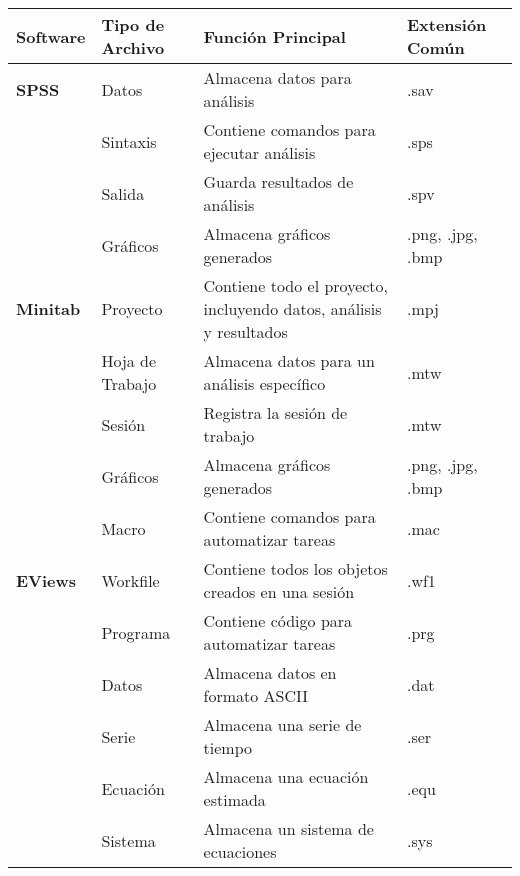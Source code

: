 \documentclass[
  stu,
  floatsintext,
  longtable,
  a4paper,
  nolmodern,
  notxfonts,
  notimes,
  colorlinks=true,linkcolor=blue,citecolor=blue,urlcolor=blue]{apa7}
\begin{document}
\begin{longtable}[]{@{}
  >{\raggedright\arraybackslash}p{}
  >{\raggedright\arraybackslash}p{}
  >{\raggedright\arraybackslash}p{}
  >{\raggedright\arraybackslash}p{}@{}}
\toprule\noalign{}
\begin{minipage}[b]{\linewidth}\raggedright
Software
\end{minipage} & \begin{minipage}[b]{\linewidth}\raggedright
Tipo de Archivo
\end{minipage} & \begin{minipage}[b]{\linewidth}\raggedright
Función Principal
\end{minipage} & \begin{minipage}[b]{\linewidth}\raggedright
Extensión Común
\end{minipage} \\
\midrule\noalign{}
\endhead
\bottomrule\noalign{}
\endlastfoot
\textbf{SPSS} & Datos & Almacena datos para análisis & .sav \\
& Sintaxis & Contiene comandos para ejecutar análisis & .sps \\
& Salida & Guarda resultados de análisis & .spv \\
& Gráficos & Almacena gráficos generados & .png, .jpg, .bmp \\
\textbf{Minitab} & Proyecto & Contiene todo el proyecto, incluyendo
datos, análisis y resultados & .mpj \\
& Hoja de Trabajo & Almacena datos para un análisis específico & .mtw \\
& Sesión & Registra la sesión de trabajo & .mtw \\
& Gráficos & Almacena gráficos generados & .png, .jpg, .bmp \\
& Macro & Contiene comandos para automatizar tareas & .mac \\
\textbf{EViews} & Workfile & Contiene todos los objetos creados en una
sesión & .wf1 \\
& Programa & Contiene código para automatizar tareas & .prg \\
& Datos & Almacena datos en formato ASCII & .dat \\
& Serie & Almacena una serie de tiempo & .ser \\
& Ecuación & Almacena una ecuación estimada & .equ \\
& Sistema & Almacena un sistema de ecuaciones & .sys \\

\end{longtable}
\end{document}
